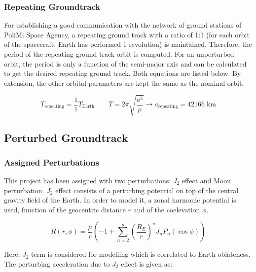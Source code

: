 \subsubsection{Repeating Groundtrack}

For establishing a good communication with the network of ground stations of PoliMi Space Agency, a repeating ground track with a ratio of 1:1 (for each orbit of the spacecraft, Earth has performed 1 revolution) is maintained. Therefore, the period of the repeating ground track orbit is computed. For an unperturbed orbit, the period is only a function of the semi-major axis and can be calculated to get the desired repeating ground track. Both equations are listed below. By extension, the other orbital parameters are kept the same as the nominal orbit. 
	
\begin{equation}
	T_{\text{repeating}} = \frac{1}{1} T_{\text{Earth}} \qquad
	T = 2\pi \sqrt{\frac{a^3}{\mu}} \rightarrow a_{\text{repeating}} = 42166 \; \text{km}
\end{equation}



\subsection{Perturbed Groundtrack}

\subsubsection{Assigned Perturbations}

This project has been assigned with two perturbations: \( J_2 \) effect and Moon perturbation. \( J_2 \) effect consists of a perturbing potential on top of the central gravity field of the Earth. In order to model it, a zonal harmonic potential is used, function of the geocentric distance \( r \) and of the coelevation \( \phi \).

\begin{equation}
	R(r, \phi) = \frac{\mu}{r} \left( -1 + \sum_{n=2}^{\infty} \left( \frac{R_E}{r} \right)^n J_n P_n(\cos\phi) \right)
\end{equation}

Here, \( J_2 \) term is considered for modelling which is correlated to Earth oblateness. The perturbing acceleration due to \( J_2 \) effect is given as:

